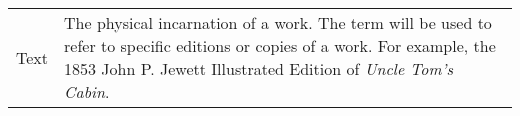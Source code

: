 \begin{spacing}{1.0}
\begin{longtable}[htbp]{@{}p{} p{}@{}}
		Text & The physical incarnation of a work. The term will be used to refer to specific editions or copies of a work. For example, the 1853 John P. Jewett Illustrated Edition of \textit{Uncle Tom's Cabin}. \\ [2ex]
	\end{longtable}
\end{spacing}

\pagebreak{}